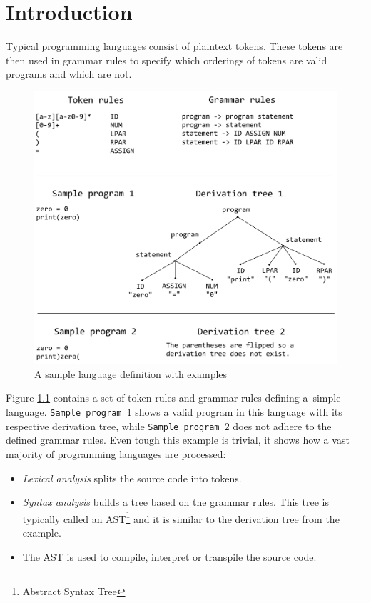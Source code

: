 \chapter{Introduction}

Typical programming languages consist of plaintext tokens. These tokens
are then used in grammar rules to specify which orderings of tokens are valid programs and
which are not.
\begin{figure}[!hbt]
	\includegraphics[width=\textwidth]{../img/tokens_and_grammar}
	\caption{A sample language definition with examples}
	\label{fig:chap1:tokens_and_grammar}
\end{figure}

Figure \ref{fig:chap1:tokens_and_grammar} contains a set of token rules and grammar rules defining a~simple
language. \texttt{Sample program $1$} shows a valid program in this language with its respective derivation tree, while
\texttt{Sample program $2$} does not adhere to the defined grammar rules.
Even tough this example is trivial, it shows how a vast majority of programming languages are processed:
\begin{itemize}
\item \emph{Lexical analysis} splits the source code into tokens.
\item \emph{Syntax analysis} builds a tree based on the grammar rules. This tree is typically called an AST\footnote{Abstract Syntax Tree}
and it is similar to the derivation tree from the example.
\item The AST is used to compile, interpret or transpile the source code.
\end{itemize}

